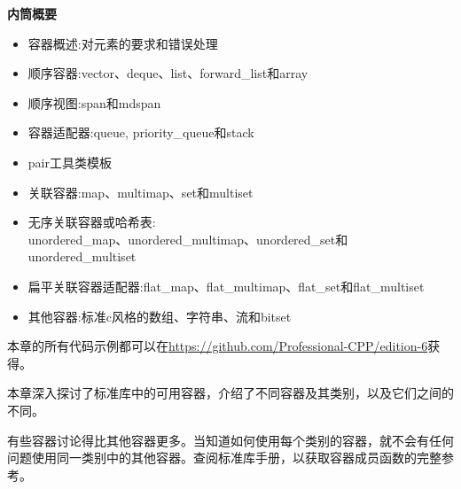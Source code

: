 \noindent
\textbf{内筒概要}

\begin{itemize}
\item
容器概述:对元素的要求和错误处理

\item
顺序容器:vector、deque、list、forward\_list和array

\item
顺序视图:span和mdspan

\item
容器适配器:queue, priority\_queue和stack

\item
pair工具类模板

\item
关联容器:map、multimap、set和multiset

\item
无序关联容器或哈希表:\\unordered\_map、unordered\_multimap、unordered\_set和unordered\_multiset

\item
扁平关联容器适配器:flat\_map、flat\_multimap、flat\_set和flat\_multiset

\item
其他容器:标准c风格的数组、字符串、流和bitset
\end{itemize}

本章的所有代码示例都可以在\url{https://github.com/Professional-CPP/edition-6}获得。

本章深入探讨了标准库中的可用容器，介绍了不同容器及其类别，以及它们之间的不同。

有些容器讨论得比其他容器更多。当知道如何使用每个类别的容器，就不会有任何问题使用同一类别中的其他容器。查阅标准库手册，以获取容器成员函数的完整参考。

